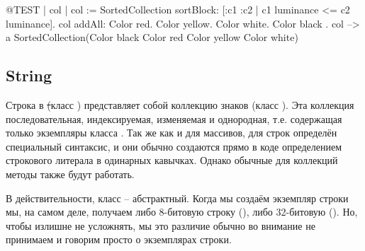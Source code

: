 \documentclass[a4paper,10pt,twoside]{book}
\begin{document}
\begin{code}{@TEST | col |}
col := SortedCollection sortBlock: [:c1 :c2 | c1 luminance <= c2 luminance].
col addAll: { Color red. Color yellow. Color white. Color black }.
col --> a SortedCollection(Color black Color red Color yellow Color white)
\end{code}

\subsection{String}
Строка в \st (класс ) представляет собой коллекцию знаков (класс ).
Эта коллекция последовательная, индексируемая, изменяемая и однородная, т.е. содержащая только экземпляры класса .
Так же как и для массивов, для строк определён специальный синтаксис, и они обычно создаются прямо в коде определением строкового литерала в одинарных кавычках. Однако обычные для коллекций методы также будут работать.


В действительности, класс  -- абстрактный.
Когда мы создаём экземпляр строки мы, на самом деле, получаем либо 8-битовую строку (), либо 32-битовую ().
Но, чтобы излишне не усложнять, мы это различие обычно во внимание не принимаем и говорим просто о экземплярах строки.
\end{document}

